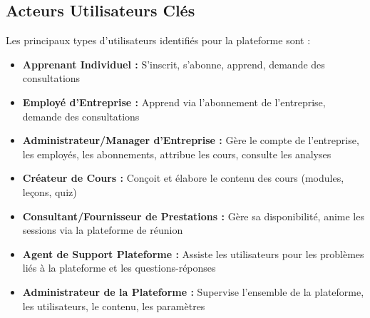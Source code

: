 \subsection{Acteurs Utilisateurs Clés}
Les principaux types d'utilisateurs identifiés pour la plateforme sont :
\begin{itemize}
  \item \textbf{Apprenant Individuel :} S'inscrit, s'abonne, apprend, demande des consultations
  \item \textbf{Employé d'Entreprise :} Apprend via l'abonnement de l'entreprise, demande des consultations
  \item \textbf{Administrateur/Manager d'Entreprise :} Gère le compte de l'entreprise, les employés, les abonnements, attribue les cours, consulte les analyses
  \item \textbf{Créateur de Cours :} Conçoit et élabore le contenu des cours (modules, leçons, quiz)
  \item \textbf{Consultant/Fournisseur de Prestations :} Gère sa disponibilité, anime les sessions via la plateforme de réunion
  \item \textbf{Agent de Support Plateforme :} Assiste les utilisateurs pour les problèmes liés à la plateforme et les questions-réponses
  \item \textbf{Administrateur de la Plateforme :} Supervise l'ensemble de la plateforme, les utilisateurs, le contenu, les paramètres
\end{itemize}

